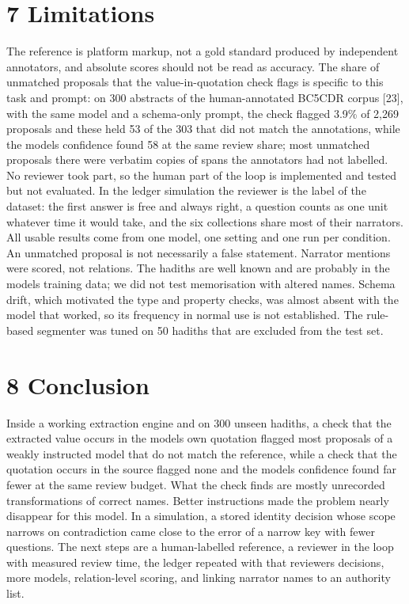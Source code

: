 \documentclass[
  english,
]{article}
\newcounter{none} %
\begin{document}
\section{7 Limitations}\label{limitations}

The reference is platform markup, not a gold standard produced by
independent annotators, and absolute scores should not be read as
accuracy. The share of unmatched proposals that the value-in-quotation
check flags is specific to this task and prompt: on 300 abstracts of the
human-annotated BC5CDR corpus {[}23{]}, with the same model and a
schema-only prompt, the check flagged 3.9\% of 2,269 proposals and these
held 53 of the 303 that did not match the annotations, while the
model\textquotesingle s confidence found 58 at the same review share;
most unmatched proposals there were verbatim copies of spans the
annotators had not labelled. No reviewer took part, so the human part of
the loop is implemented and tested but not evaluated. In the ledger
simulation the reviewer is the label of the dataset: the first answer is
free and always right, a question counts as one unit whatever time it
would take, and the six collections share most of their narrators. All
usable results come from one model, one setting and one run per
condition. An unmatched proposal is not necessarily a false statement.
Narrator mentions were scored, not relations. The hadiths are well known
and are probably in the model\textquotesingle s training data; we did
not test memorisation with altered names. Schema drift, which motivated
the type and property checks, was almost absent with the model that
worked, so its frequency in normal use is not established. The
rule-based segmenter was tuned on 50 hadiths that are excluded from the
test set.

\section{8 Conclusion}\label{conclusion}

Inside a working extraction engine and on 300 unseen hadiths, a check
that the extracted value occurs in the model\textquotesingle s own
quotation flagged most proposals of a weakly instructed model that do
not match the reference, while a check that the quotation occurs in the
source flagged none and the model\textquotesingle s confidence found far
fewer at the same review budget. What the check finds are mostly
unrecorded transformations of correct names. Better instructions made
the problem nearly disappear for this model. In a simulation, a stored
identity decision whose scope narrows on contradiction came close to the
error of a narrow key with fewer questions. The next steps are a
human-labelled reference, a reviewer in the loop with measured review
time, the ledger repeated with that reviewer\textquotesingle s
decisions, more models, relation-level scoring, and linking narrator
names to an authority list.
\end{document}
